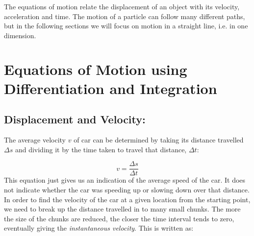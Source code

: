 




\addtolength{\topmargin}{-0.7 cm}
\setlength{\columnsep}{22pt}
\nll
The equations of motion relate the displacement of an object with its velocity, acceleration and time. The motion of a particle can follow many different paths, but in the following sections we will focus on motion in a straight line, i.e. in one dimension. 

\section{Equations of Motion using Differentiation and Integration}
\subsection{Displacement and Velocity:}
The average velocity $v$ of car can be determined by taking its distance travelled $\Delta s$ and dividing it by the time taken to travel that distance, $\Delta t$:

\begin{equation}
v = \frac{\Delta s}{\Delta t}   
\end{equation}
This equation just gives us an indication of the average speed of the car. It does not indicate whether the car was speeding up or slowing down over that distance. In order to find the velocity of the car at a given location from the starting point, we need to break up the distance travelled in to many small chunks. The more the size of the chunks are reduced, the closer the time interval tends to zero, eventually giving the \textit{instantaneous velocity}. This is written as:

